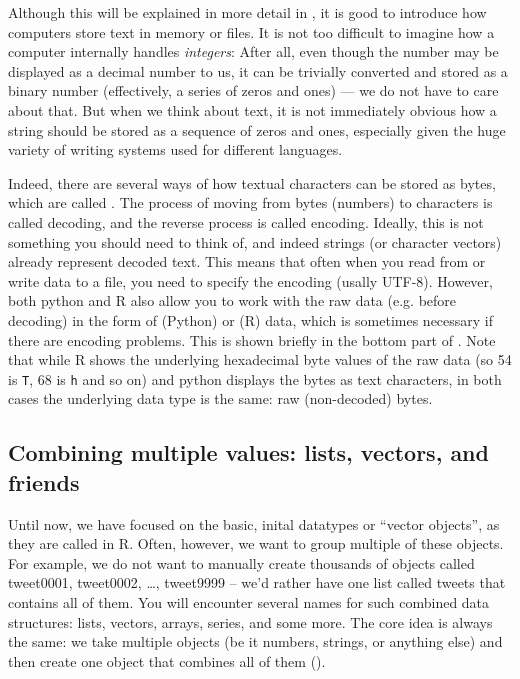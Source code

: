 Although this will be explained in more detail in ,
it is good to introduce how computers store text in memory or files. 
It is not too difficult to imagine how a computer internally
handles \emph{integers}: After all, even though the number may be displayed
as a decimal number to us, it can be trivially converted and stored
as a binary number (effectively, a series of zeros and ones)
--- we do not have to care about that.
But when we think about text, it is not
immediately obvious how a string should be stored as a sequence of
zeros and ones, especially given the huge variety of writing systems used for different languages. 

Indeed, there are several ways of how textual characters can be stored as bytes,
which are called . 
The process of moving from bytes (numbers) to characters is called decoding,
and the reverse process is called encoding. 
Ideally, this is not something you should need to think of,
and indeed strings (or character vectors) already represent decoded text.
This means that often when you read from or write data to a file,
you need to specify the encoding (usally UTF-8). 
However, both python and R also allow you to work with the raw data
(e.g. before decoding) in the form of  (Python) or  (R) data,
which is sometimes necessary if there are encoding problems.
This is shown briefly in the bottom part of .
Note that while R shows the underlying hexadecimal byte values of the raw data (so 54 is \verb|T|, 68 is \verb|h| and so on) and python displays the bytes as text characters, in both cases the underlying data type is the same: raw (non-decoded) bytes.



\subsection{Combining multiple values: lists, vectors, and friends}

Until now, we have focused on the basic, inital datatypes or ``vector
objects'', as they are called in R.  Often, however, we want to group
multiple of these objects. For example, we do not want to manually
create thousands of objects called tweet0001, tweet0002, \ldots,
tweet9999 -- we'd rather have one list called tweets that contains all
of them. You will encounter several names for such combined data
structures: lists, vectors, arrays, series, and some
more. 
The core idea is always the same: we take multiple objects
(be it numbers, strings, or anything else) and then create one object that combines all of them ().

